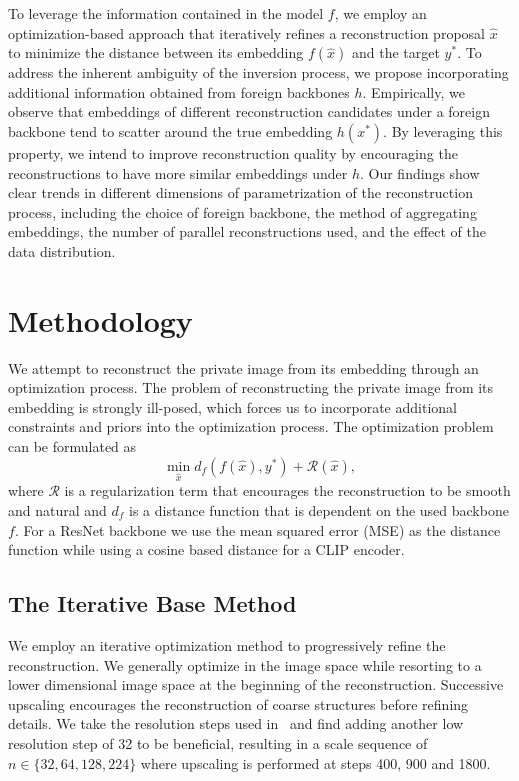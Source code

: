 \documentclass[10pt,twocolumn]{article}
\begin{document}
To leverage the information contained in the model $f$, we employ an optimization-based approach that iteratively refines a reconstruction proposal $\hat{x}$ to minimize the distance between its embedding $f(\hat{x})$ and the target $y^*$.
To address the inherent ambiguity of the inversion process, we propose incorporating additional information obtained from foreign backbones $h$.
Empirically, we observe that embeddings of different reconstruction candidates under a foreign backbone tend to scatter around the true embedding $h(x^*)$.
By leveraging this property, we intend to improve reconstruction quality by encouraging the reconstructions to have more similar embeddings under $h$.
Our findings show clear trends in different dimensions of parametrization of the reconstruction process, including the choice of foreign backbone, the method of aggregating embeddings, the number of parallel reconstructions used, and the effect of the data distribution.

\section{Methodology}
We attempt to reconstruct the private image from its embedding through an optimization process.
The problem of reconstructing the private image from its embedding is strongly ill-posed, which forces us to incorporate additional constraints and priors into the optimization process.
The optimization problem can be formulated as
$$
\min_{\hat{x}} d_f(f(\hat{x}), y^*) + \mathcal{R}(\hat{x}),
$$
where $\mathcal{R}$ is a regularization term that encourages the reconstruction to be smooth and natural and $d_f$ is a distance function that is dependent on the used backbone $f$.
For a ResNet backbone we use the mean squared error (MSE) as the distance function while using a cosine based distance for a CLIP encoder.
\subsection{The Iterative Base Method}\label{base_method}
We employ an iterative optimization method to progressively refine the reconstruction.
We generally optimize in the image space while resorting to a lower dimensional image space at the beginning of the reconstruction.
Successive upscaling encourages the reconstruction of coarse structures before refining details.
We take the resolution steps used in~\cite{kazemiWhatWeLearn2024} and find adding another low resolution step of 32 to be beneficial, resulting in a scale sequence of $n\in\{32, 64, 128, 224\}$ where upscaling is performed at steps 400, 900 and 1800.
\end{document}
